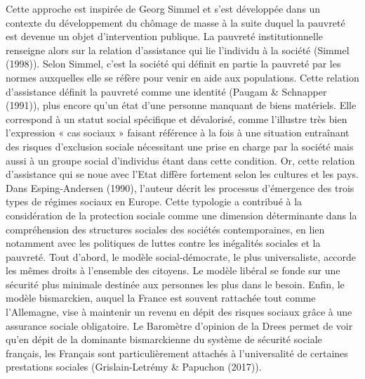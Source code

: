 \documentclass[12pt,a4paper]{reedthesis}
\begin{document}
Cette approche est inspirée de Georg Simmel et s'est développée dans un contexte du développement du chômage de masse à la suite duquel la pauvreté est devenue un objet d'intervention publique. La pauvreté institutionnelle renseigne alors sur la relation d'assistance qui lie l'individu à la société (Simmel (1998)). Selon Simmel, c'est la société qui définit en partie la pauvreté par les normes auxquelles elle se réfère pour venir en aide aux populations. Cette relation d'assistance définit la pauvreté comme une identité (Paugam \& Schnapper (1991)), plus encore qu'un état d'une personne manquant de biens matériels. Elle correspond à un statut social spécifique et dévalorisé, comme l'illustre très bien l'expression « cas sociaux » faisant référence à la fois à une situation entraînant des risques d'exclusion sociale nécessitant une prise en charge par la société mais aussi à un groupe social d'individus étant dans cette condition.
Or, cette relation d'assistance qui se noue avec l'Etat diffère fortement selon les cultures et les pays. Dans Esping-Andersen (1990), l'auteur décrit les processus d'émergence des trois types de régimes sociaux en Europe. Cette typologie a contribué à la considération de la protection sociale comme une dimension déterminante dans la compréhension des structures sociales des sociétés contemporaines, en lien notamment avec les politiques de luttes contre les inégalités sociales et la pauvreté. Tout d'abord, le modèle social-démocrate, le plus universaliste, accorde les mêmes droits à l'ensemble des citoyens. Le modèle libéral se fonde sur une sécurité plus minimale destinée aux personnes les plus dans le besoin. Enfin, le modèle bismarckien, auquel la France est souvent rattachée tout comme l'Allemagne, vise à maintenir un revenu en dépit des risques sociaux grâce à une assurance sociale obligatoire. Le Baromètre d'opinion de la Drees permet de voir qu'en dépit de la dominante bismarckienne du système de sécurité sociale français, les Français sont particulièrement attachés à l'universalité de certaines prestations sociales (Grislain-Letrémy \& Papuchon (2017)).
\end{document}
